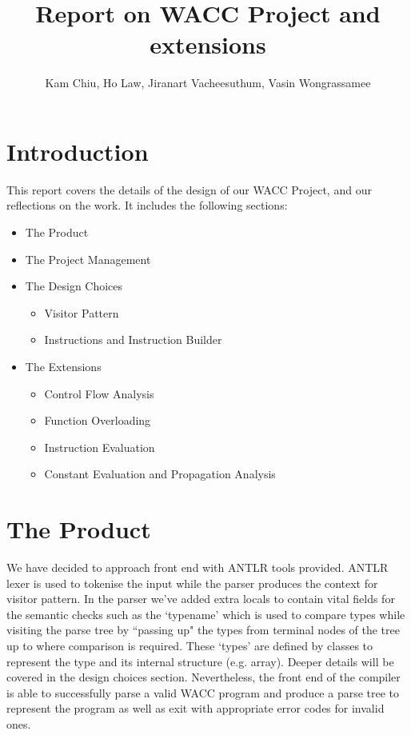 \documentclass[11pt]{article}
\begin{document}
\title{Report on WACC Project and extensions}
\author{Kam Chiu, Ho Law, Jiranart Vacheesuthum, Vasin Wongrassamee}

\maketitle

\section{Introduction}

This report covers the details of the design of our WACC Project, and our reflections on the work. It includes the following sections:

\begin{multicols}{2}
\begin{itemize}
  \item The Product
  \item The Project Management
  \item The Design Choices
  \begin{itemize}
    \item Visitor Pattern
    \item Instructions and Instruction Builder
  \end{itemize}
  \item The Extensions
  \begin{itemize}
    \item Control Flow Analysis
    \item Function Overloading
    \item Instruction Evaluation
    \item Constant Evaluation and Propagation Analysis
  \end{itemize}
\end{itemize}
\end{multicols}

\section{The Product}

We have decided to approach front end with ANTLR tools provided. ANTLR lexer is used to tokenise the input while the parser produces the context for visitor pattern. In the parser we've added extra locals to contain vital fields for the semantic checks such as the `typename' which is used to compare types while visiting the parse tree by ``passing up" the types from terminal nodes of the tree up to where comparison is required. These `types' are defined by classes to represent the type and its internal structure (e.g. array). Deeper details will be covered in the design choices section. Nevertheless, the front end of the compiler is able to successfully parse a valid WACC program and produce a parse tree to represent the program as well as exit with appropriate error codes for invalid ones.
\end{document}
